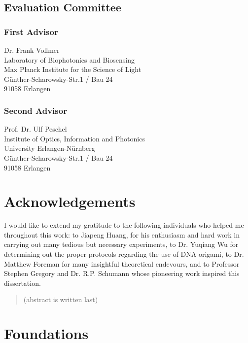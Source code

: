 \documentclass[a4paper,titlepage,onecolumn]{report}
\begin{document}
\section*{Evaluation Committee}
\subsection*{First Advisor}
Dr. Frank Vollmer\\
Laboratory of Biophotonics and Biosensing\\
Max Planck Institute for the Science of Light\\
G\"unther-Scharowsky-Str.1 / Bau 24\\
91058 Erlangen
\subsection*{Second Advisor}
Prof. Dr. Ulf Peschel\\
Institute of Optics, Information and Photonics\\
University Erlangen-N\"urnberg\\
G\"unther-Scharowsky-Str.1 / Bau 24\\
91058 Erlangen

\newpage
\chapter*{Acknowledgements}
I would like to extend my gratitude to the following individuals who helped me throughout this work: to Jiapeng Huang, for his enthusiasm and hard work in carrying out many tedious but necessary experiments, to Dr. Yuqiang Wu for determining out the proper protocols regarding the use of DNA origami, to Dr. Matthew Foreman for many insightful theoretical endevours, and to Professor Stephen Gregory and Dr. R.P. Schumann whose pioneering work inspired this dissertation.

\tableofcontents

\begin{abstract}
(abstract is written last)
\end{abstract}

\chapter{Foundations}
\end{document}
